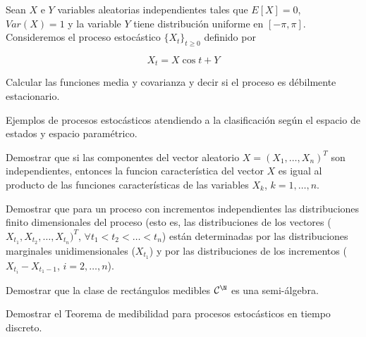\begin{ejer}
  Sean $X$ e $Y$ variables aleatorias independientes tales que $E[X] = 0$, $Var(X) = 1$ y la variable $Y$ tiene distribución uniforme en $[-\pi, \pi]$. Consideremos el proceso estocástico $\{X_t\}_{t \geq 0}$ definido por

  $$X_t = X \cos{t + Y}$$

  Calcular las funciones media y covarianza y decir si el proceso es débilmente estacionario.
\end{ejer}

\begin{sol}
\end{sol}

\begin{ejer}
  Ejemplos de procesos estocásticos atendiendo a la clasificación según el espacio de estados y espacio paramétrico.
\end{ejer}

\begin{sol}
\end{sol}

\begin{ejer}
  Demostrar que si las componentes del vector aleatorio $X = (X_1, \ldots, X_n)^T$ son independientes, entonces la funcion característica del vector $X$ es igual al producto de las funciones características de las variables $X_k$, $k = 1, \ldots, n$.
\end{ejer}

\begin{sol}
\end{sol}

\begin{ejer}
  Demostrar que para un proceso con incrementos independientes las distribuciones finito dimensionales del proceso (esto es, las distribuciones de los vectores ($X_{t_1}, X_{t_2}, \ldots, X_{t_n})^T$, $\forall t_1 < t_2 < \ldots < t_n$) están determinadas por las distribuciones marginales unidimensionales ($X_{t_1}$) y por las distribuciones de los incrementos ($X_{t_i} - X_{t_1 - 1}$, $i = 2, \ldots, n$).
\end{ejer}

\begin{sol}
\end{sol}

\begin{ejer}
  Demostrar que la clase de rectángulos medibles $\mathcal{C}^\N$ es una semi-álgebra.
\end{ejer}

\begin{sol}
\end{sol}

\begin{ejer}
  Demostrar el Teorema de medibilidad para procesos estocásticos en tiempo discreto.
\end{ejer}

\begin{sol}
\end{sol}
